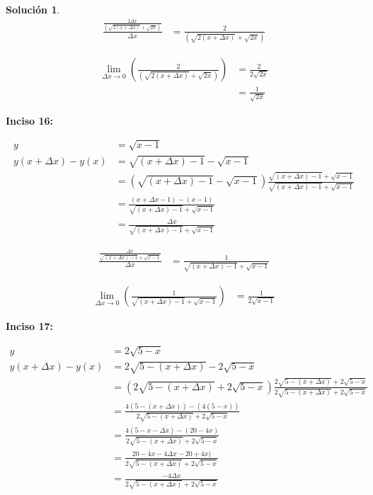 \documentclass{article}
\theoremstyle{definition}
\newtheorem*{solution}{Solución}
\begin{document}
\begin{solution}
    \begin{align*}
        \frac{\frac{2\Delta x}{(\sqrt{2(x+\Delta x)} + \sqrt{2x})}}{\Delta x} &= \frac{2}{(\sqrt{2(x+\Delta x)} + \sqrt{2x})} 
    \end{align*}

    \begin{align*}
        \lim_{\Delta x \to 0} (\frac{2}{(\sqrt{2(x+\Delta x)} + \sqrt{2x})}) &= \frac{2}{2\sqrt{2x}} \\
        &= \frac{1}{\sqrt{2x}}
    \end{align*} 

\textbf{Inciso 16:}

    \begin{align*}
        y &= \sqrt{x-1}  \\
        y(x+\Delta x) - y(x) &= \sqrt{(x+\Delta x)-1} - \sqrt{x-1} \\
        &= (\sqrt{(x+\Delta x)-1} - \sqrt{x-1}) \frac{\sqrt{(x+\Delta x)-1} + \sqrt{x-1}}{\sqrt{(x+\Delta x)-1} + \sqrt{x-1}} \\
        &= \frac{(x+\Delta x-1)-(x-1)}{\sqrt{(x+\Delta x)-1} + \sqrt{x-1}} \\
        &= \frac{\Delta x}{\sqrt{(x+\Delta x)-1} + \sqrt{x-1}}
    \end{align*}

    \begin{align*}
        \frac{\frac{\Delta x}{\sqrt{(x+\Delta x)-1} + \sqrt{x-1}}}{\Delta x} &= \frac{1}{\sqrt{(x+\Delta x)-1} + \sqrt{x-1}} 
    \end{align*}

    \begin{align*}
        \lim_{\Delta x \to 0} (\frac{1}{\sqrt{(x+\Delta x)-1} + \sqrt{x-1}} ) &= \frac{1}{2\sqrt{x-1}} 
    \end{align*} 

\textbf{Inciso 17:}

    \begin{align*}
        y &= 2\sqrt{5-x} \\
        y(x+\Delta x) - y(x) &= 2\sqrt{5-(x+\Delta x)} - 2\sqrt{5-x} \\
        &= (2\sqrt{5-(x+\Delta x)} + 2\sqrt{5-x}) \frac{2\sqrt{5-(x+\Delta x)} + 2\sqrt{5-x}}{2\sqrt{5-(x+\Delta x)} + 2\sqrt{5-x}} \\
        &= \frac{4(5-(x+\Delta x))-(4(5-x))}{2\sqrt{5-(x+\Delta x)} + 2\sqrt{5-x}} \\
        &= \frac{4(5-x-\Delta x)-(20-4x)}{2\sqrt{5-(x+\Delta x)} + 2\sqrt{5-x}} \\
        &= \frac{20-4x-4\Delta x-20+4x)}{2\sqrt{5-(x+\Delta x)} + 2\sqrt{5-x}} \\
        &= \frac{-4\Delta x}{2\sqrt{5-(x+\Delta x)} + 2\sqrt{5-x}}
    \end{align*}


\end{solution}
\end{document}
